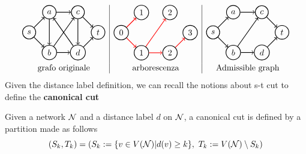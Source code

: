 \[
    \begin{array}{c|c|c}
        
    
    \begin{tikzpicture}[node distance={12mm}, thick , main/.style = {draw, circle}] 
    \node[main] (1) {$s$}; 
    \node[main] (2) [above right of=1] {$a$};
    \node[main] (3) [below right of=1] {$b$};
    \node[main] (4) [right of=2] {$c$};
    \node[main] (5) [right of=3] {$d$};
    \node[main] (6) [above right of=5] {$t$};
    \draw[->] (1) to (2);
    \draw[->] (1) to (3);
    \draw[->] (3) to (5);
    \draw[->] (2) to (4);
    \draw[->] (5) to (6);
    \draw[->] (4) to (6);
    \draw[->] (3) to (4);
    \draw[->] (4) to (5);
    \draw[->] (5) to (2);
    \draw[->] (2) to (3);
\end{tikzpicture}  &
\begin{tikzpicture}[node distance={12mm}, thick , main/.style = {draw, circle}] 
    \node[main] (1) {$0$}; 
    \node[main] (2) [above right of=1] {$1$};
    \node[main] (3) [below right of=1] {$1$};
    \node[main] (4) [right of=2] {$2$};
    \node[main] (5) [right of=3] {$2$};
    \node[main] (6) [above right of=5] {$3$};
    \draw[->, red] (1) to (2);
    \draw[->, red] (1) to (3);
    \draw[->, red] (3) to (5);
    \draw[->, red] (5) to (6);
    \draw[->, red] (3) to (4);
\end{tikzpicture} &
\begin{tikzpicture}[node distance={12mm}, thick , main/.style = {draw, circle}] 
    \node[main] (1) {$s$}; 
    \node[main] (2) [above right of=1] {$a$};
    \node[main] (3) [below right of=1] {$b$};
    \node[main] (4) [right of=2] {$c$};
    \node[main] (5) [right of=3] {$d$};
    \node[main] (6) [above right of=5] {$t$};
    \draw[->] (1) to (2);
    \draw[->] (1) to (3);
    \draw[->] (3) to (5);
    \draw[->] (5) to (6);
    \draw[->] (3) to (4);
    \draw[->] (2) to (4);
    \draw[->] (4) to (6);
\end{tikzpicture} \\
\text{grafo originale}&\text{arborescenza} & \text{Admissible graph}
\end{array} 
\]
Given the distance label definition, we can recall the notions about s-t cut to define the \textbf{canonical cut}
\begin{definition}
    \label{cancut}
    Given a network $\mathcal{N}$ and a distance label $d$ on $\mathcal{N}$, a canonical cut is defined by a partition made as follows
    \[(S_k, T_k) =  (S_k:=\{v\in V(\mathcal{N}) | d(v) \ge k\},\ T_k := V(\mathcal{N})\setminus S_k)\]
\end{definition}

